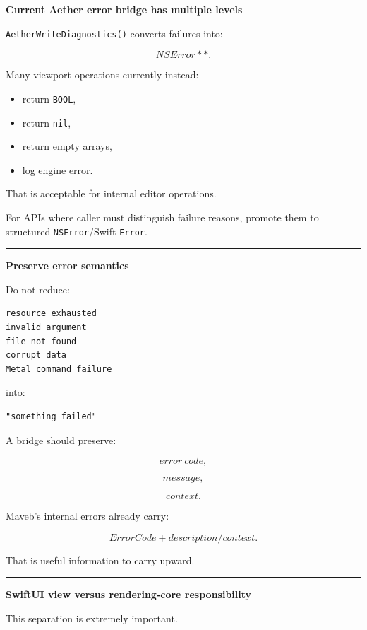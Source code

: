 \textbf{Current Aether error bridge has multiple levels}

\texttt{AetherWriteDiagnostics()} converts failures into:

\[
NSError**.
\]

Many viewport operations currently instead:

\begin{itemize}
\tightlist
\item
  return \texttt{BOOL},
\item
  return \texttt{nil},
\item
  return empty arrays,
\item
  log engine error.
\end{itemize}

That is acceptable for internal editor operations.

For APIs where caller must distinguish failure reasons, promote them to structured \texttt{NSError}/Swift \texttt{Error}.

\begin{center}\rule{0.5\linewidth}{0.5pt}\end{center}

\textbf{Preserve error semantics}

Do not reduce:

\begin{verbatim}
resource exhausted
invalid argument
file not found
corrupt data
Metal command failure
\end{verbatim}

into:

\begin{verbatim}
"something failed"
\end{verbatim}

A bridge should preserve:

\[
error\ code,
\]

\[
message,
\]

\[
context.
\]

Maveb's internal errors already carry:

\[
ErrorCode
+
description/context.
\]

That is useful information to carry upward.

\begin{center}\rule{0.5\linewidth}{0.5pt}\end{center}

\textbf{SwiftUI view versus rendering-core responsibility}

This separation is extremely important.

